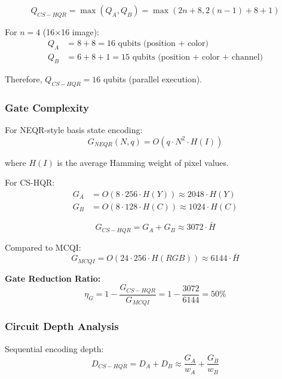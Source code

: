 \documentclass[11pt,a4paper]{article}
\begin{document}
\begin{equation}
Q_{CS-HQR} = \max(Q_A, Q_B) = \max(2n + 8, 2(n-1) + 8 + 1)
\label{eq:qubit_complexity}
\end{equation}

For $n = 4$ (16×16 image):
\begin{align}
Q_A &= 8 + 8 = 16 \text{ qubits (position + color)} \\
Q_B &= 6 + 8 + 1 = 15 \text{ qubits (position + color + channel)}
\end{align}

Therefore, $Q_{CS-HQR} = 16$ qubits (parallel execution).

\subsubsection{Gate Complexity}

For NEQR-style basis state encoding:
\begin{equation}
G_{NEQR}(N, q) = O(q \cdot N^2 \cdot H(I))
\label{eq:neqr_gates}
\end{equation}

where $H(I)$ is the average Hamming weight of pixel values.

For CS-HQR:
\begin{align}
G_A &= O(8 \cdot 256 \cdot H(Y)) \approx 2048 \cdot H(Y) \\
G_B &= O(8 \cdot 128 \cdot H(C)) \approx 1024 \cdot H(C)
\end{align}

\begin{equation}
G_{CS-HQR} = G_A + G_B \approx 3072 \cdot \bar{H}
\label{eq:cshqr_gates}
\end{equation}

Compared to MCQI:
\begin{equation}
G_{MCQI} = O(24 \cdot 256 \cdot H(RGB)) \approx 6144 \cdot \bar{H}
\label{eq:mcqi_gates}
\end{equation}

\textbf{Gate Reduction Ratio:}
\begin{equation}
\eta_G = 1 - \frac{G_{CS-HQR}}{G_{MCQI}} = 1 - \frac{3072}{6144} = 50\%
\label{eq:gate_reduction}
\end{equation}

\subsubsection{Circuit Depth Analysis}

Sequential encoding depth:
\begin{equation}
D_{CS-HQR} = D_A + D_B \approx \frac{G_A}{w_A} + \frac{G_B}{w_B}
\label{eq:depth}
\end{equation}
\end{document}
